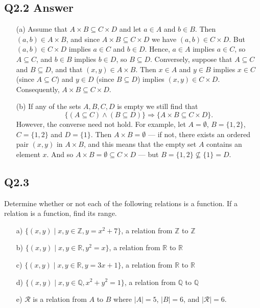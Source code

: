\documentclass{article}
\begin{document}
\subsection*{Q2.2 Answer}
\begin{enumerate}
    \item[(a)] Assume that \( A \times B \subseteq C \times D \) and let \( a \in A \) and \( b \in B \). Then \( (a, b) \in A \times B \), and since \( A \times B \subseteq C \times D \) we have \( (a, b) \in C \times D \). But \( (a, b) \in C \times D \) implies \( a \in C \) and \( b \in D \). Hence, \( a \in A \) implies \( a \in C \), so \( A \subseteq C \), and \( b \in B \) implies \( b \in D \), so \( B \subseteq D \).
    Conversely, suppose that \( A \subseteq C \) and \( B \subseteq D \), and that \( (x, y) \in A \times B \). Then \( x \in A \) and \( y \in B \) implies \( x \in C \) (since \( A \subseteq C \)) and \( y \in D \) (since \( B \subseteq D \)) implies \( (x, y) \in C \times D \). Consequently, \( A \times B \subseteq C \times D \).
    \item[(b)] If any of the sets \( A, B, C, D \) is empty we still find that
    \[
    \{ (A \subseteq C) \land (B \subseteq D) \} \Rightarrow \{ A \times B \subseteq C \times D \}.
    \]
    However, the converse need not hold. For example, let \( A = \emptyset \), \( B = \{1, 2\} \), \( C = \{1, 2\} \) and \( D = \{1\} \). Then \( A \times B = \emptyset \) --- if not, there exists an ordered pair \( (x, y) \) in \( A \times B \), and this means that the empty set \( A \) contains an element \( x \). And so \( A \times B = \emptyset \subseteq C \times D \) --- but \( B = \{1, 2\} \not\subseteq \{1\} = D \).
\end{enumerate}
\newpage

\subsection*{Q2.3}
 Determine whether or not each of the following relations is a function. If a relation is a function, find its range.

\begin{enumerate}
    \item[a)] \( \{ (x, y) \mid x, y \in \mathbb{Z}, y = x^2 + 7 \} \), a relation from \(\mathbb{Z}\) to \(\mathbb{Z}\)
    \item[b)] \( \{ (x, y) \mid x, y \in \mathbb{R}, y^2 = x \} \), a relation from \(\mathbb{R}\) to \(\mathbb{R}\)
    \item[c)] \( \{ (x, y) \mid x, y \in \mathbb{R}, y = 3x + 1 \} \), a relation from \(\mathbb{R}\) to \(\mathbb{R}\)
    \item[d)] \( \{ (x, y) \mid x, y \in \mathbb{Q}, x^2 + y^2 = 1 \} \), a relation from \(\mathbb{Q}\) to \(\mathbb{Q}\)
    \item[e)] \( \mathcal{R} \) is a relation from \( A \) to \( B \) where \( |A| = 5 \), \( |B| = 6 \), and \( |\mathcal{R}| = 6 \).
\end{enumerate}
\newpage
\end{document}
